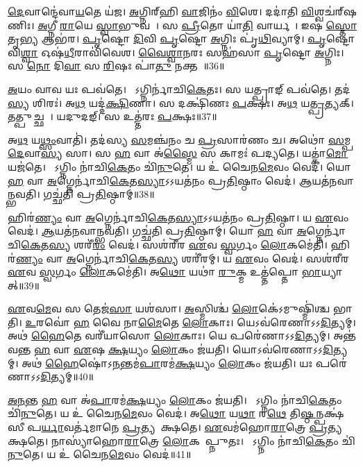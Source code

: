    \ul{𑌦𑍇}𑌵𑌾𑌨𑍍𑌦𑍇॑𑌵𑌾\ul{𑌯}𑌤𑍇 𑌯॑𑌜।
   \ul{𑌅}𑌗𑍍𑌨𑌿𑌰𑍍{‌}𑌹𑌿 \ul{𑌵𑌾}𑌜𑌿𑌨𑌂॑ \ul{𑌵𑌿}𑌶𑍇।
   𑌦𑌦𑌾॑𑌤𑌿 \ul{𑌵𑌿}𑌶𑍍𑌵𑌚॑𑌰𑍍{‌}𑌷𑌣𑌿𑌃।
   \ul{𑌅}𑌗𑍍𑌨𑍀 \ul{𑌰𑌾}𑌯𑍇 \ul{𑌸𑍍𑌵𑌾}𑌭𑍁𑌵𑌮𑍍᳚।
   𑌸 \ul{𑌪𑍍𑌰𑍀}𑌤𑍋 𑌯𑌾॑\ul{𑌤𑌿} 𑌵𑌾𑌰𑍍𑌯𑌮𑍍᳚।
   𑌇𑌷॑ \ul{𑌸𑍍𑌤𑍋}𑌤𑍃\ul{𑌭𑍍𑌯} 𑌆𑌭॑𑌰।
   \ul{𑌪𑍃}𑌷𑍍𑌟𑍋 \ul{𑌦𑌿}𑌵𑌿 \ul{𑌪𑍃}𑌷𑍍𑌟𑍋 \ul{𑌅}𑌗𑍍𑌨𑌿𑌃 𑌪𑍃॑\ul{𑌥𑌿}𑌵𑍍𑌯𑌾𑌮𑍍।
   \ul{𑌪𑍃}𑌷𑍍𑌟𑍋 𑌵𑌿\ul{𑌶𑍍𑌵𑌾} 𑌓𑌷॑\ul{𑌧𑍀}𑌰𑌾𑌵𑌿॑𑌵𑍇𑌶।
   \ul{𑌵𑍈}\ul{𑌶𑍍𑌵𑌾}\ul{𑌨}𑌰𑌃 𑌸𑌹॑𑌸𑌾 \ul{𑌪𑍃}𑌷𑍍𑌟𑍋 \ul{𑌅}𑌗𑍍𑌨𑌿𑌃।
   𑌸 \ul{𑌨𑍋} 𑌦𑌿\ul{𑌵𑌾} 𑌸 \ul{𑌰𑌿}𑌷𑌃 𑌪𑌾॑\ul{𑌤𑍁} 𑌨𑌕𑍍𑌤𑌮𑍍᳚॥36॥
\anuvakamend
  
   \ul{𑌅}𑌯𑌂 𑌵𑌾𑌵 𑌯𑌃 𑌪𑌵॑𑌤𑍇।
   𑌸𑍋᳚𑌽𑌗𑍍𑌨𑌿𑌰𑍍𑌨𑌾॑𑌚𑌿\ul{𑌕𑍇}𑌤𑌃।
   𑌸 𑌯𑌤𑍍𑌪𑍍𑌰𑌾𑌙𑍍 𑌪𑌵॑𑌤𑍇।
   𑌤𑌦॑\ul{𑌸𑍍𑌯} 𑌶𑌿𑌰𑌃॑।
   𑌅\ul{𑌥} 𑌯𑌦𑍍𑌦॑\ul{𑌕𑍍𑌷𑌿}𑌣𑌾।
   𑌸 𑌦𑌕𑍍𑌷𑌿॑𑌣𑌃 \ul{𑌪}𑌕𑍍𑌷𑌃।
   𑌅\ul{𑌥} 𑌯\ul{𑌤𑍍𑌪𑍍𑌰}𑌤𑍍𑌯𑌕𑍍।
   𑌤𑌤𑍍𑌪𑍁𑌚𑍍𑌛𑌮𑍍᳚।
   𑌯𑌦𑍁𑌦𑌙𑍍{‌}\sG{}।
   𑌸 𑌉𑌤𑍍𑌤॑𑌰𑌃 \ul{𑌪}𑌕𑍍𑌷𑌃॥37॥

   𑌅\ul{𑌥} 𑌯\ul{𑌥𑍍𑌸𑌂}𑌵𑌾𑌤𑌿॑।
   𑌤𑌦॑𑌸𑍍𑌯 \ul{𑌸}𑌮𑌞𑍍𑌚॑𑌨𑌂 𑌚 \ul{𑌪𑍍𑌰}𑌸𑌾𑌰॑𑌣𑌂 𑌚।
   𑌅𑌥𑍋॑ \ul{𑌸}𑌮𑍍𑌪\ul{𑌦𑍇}𑌵𑌾\ul{𑌸𑍍𑌯} 𑌸𑌾।
   𑌸 \ul{𑌹} 𑌵𑌾 𑌅॑\ul{𑌸𑍍𑌮𑍈} 𑌸 𑌕𑌾𑌮𑌃॑ 𑌪𑌦𑍍𑌯𑌤𑍇।
   𑌯𑌤𑍍𑌕𑌾॑\ul{𑌮𑍋} 𑌯𑌜॑𑌤𑍇।
   𑌯𑍋᳚𑌽𑌗𑍍𑌨𑌿𑌂 𑌨𑌾॑𑌚𑌿\ul{𑌕𑍇}𑌤𑌂 𑌚𑌿॑\ul{𑌨𑍁}𑌤𑍇।
   𑌯 𑌉॑ 𑌚𑍈𑌨\ul{𑌮𑍇}𑌵𑌂 𑌵𑍇𑌦॑।
   𑌯𑍋 \ul{𑌹} 𑌵𑌾 \ul{𑌅}𑌗𑍍𑌨𑍇𑌰𑍍𑌨𑌾॑𑌚𑌿\ul{𑌕𑍇}𑌤\ul{𑌸𑍍𑌯𑌾}𑌽𑌽𑌯𑌤॑𑌨𑌂 𑌪𑍍𑌰\ul{𑌤𑌿}𑌷𑍍𑌠𑌾𑌂 𑌵𑍇𑌦॑।
   \ul{𑌆}𑌯𑌤॑𑌨𑌵𑌾𑌨𑍍𑌭𑌵𑌤𑌿।
   𑌗𑌚𑍍𑌛॑𑌤𑌿 𑌪𑍍𑌰\ul{𑌤𑌿}𑌷𑍍𑌠𑌾𑌮𑍍॥38॥

   𑌹𑌿𑌰॑\ul{𑌣𑍍𑌯𑌂} 𑌵𑌾 \ul{𑌅}𑌗𑍍𑌨𑍇𑌰𑍍𑌨𑌾॑𑌚𑌿\ul{𑌕𑍇}𑌤\ul{𑌸𑍍𑌯𑌾}𑌽𑌽𑌯𑌤॑𑌨𑌂 𑌪𑍍𑌰\ul{𑌤𑌿}𑌷𑍍𑌠𑌾।
   𑌯 \ul{𑌏}𑌵𑌂 𑌵𑍇𑌦॑।
   \ul{𑌆}𑌯𑌤॑𑌨𑌵𑌾𑌨𑍍𑌭𑌵𑌤𑌿।
   𑌗𑌚𑍍𑌛॑𑌤𑌿 𑌪𑍍𑌰\ul{𑌤𑌿}𑌷𑍍𑌠𑌾𑌮𑍍।
   𑌯𑍋 \ul{𑌹} 𑌵𑌾 \ul{𑌅}𑌗𑍍𑌨𑍇𑌰𑍍𑌨𑌾॑𑌚𑌿\ul{𑌕𑍇}𑌤\ul{𑌸𑍍𑌯} 𑌶𑌰𑍀॑\ul{𑌰𑌂} 𑌵𑍇𑌦॑।
   𑌸𑌶॑𑌰𑍀𑌰 \ul{𑌏}𑌵 \ul{𑌸𑍍𑌵}𑌰𑍍𑌗𑌂 \ul{𑌲𑍋}𑌕𑌮𑍇॑𑌤𑌿।
   𑌹𑌿𑌰॑\ul{𑌣𑍍𑌯𑌂} 𑌵𑌾 \ul{𑌅}𑌗𑍍𑌨𑍇𑌰𑍍𑌨𑌾॑𑌚𑌿\ul{𑌕𑍇}𑌤\ul{𑌸𑍍𑌯} 𑌶𑌰𑍀॑𑌰𑌮𑍍।
   𑌯 \ul{𑌏}𑌵𑌂 𑌵𑍇𑌦॑।
   𑌸𑌶॑𑌰𑍀𑌰 \ul{𑌏}𑌵 \ul{𑌸𑍍𑌵}𑌰𑍍𑌗𑌂 \ul{𑌲𑍋}𑌕𑌮𑍇॑𑌤𑌿।
   𑌅\ul{𑌥𑍋} 𑌯𑌥𑌾॑ \ul{𑌰𑍁}𑌕𑍍𑌮 𑌉𑌤𑍍𑌤॑𑌪𑍍𑌤𑍋 \ul{𑌭𑌾}𑌯𑍍𑌯𑌾𑌤𑍍॥39॥

   \ul{𑌏}𑌵\ul{𑌮𑍇}𑌵 𑌸 𑌤𑍇𑌜॑\ul{𑌸𑌾} 𑌯𑌶॑𑌸𑌾।
   \ul{𑌅}𑌸𑍍𑌮𑌿𑌶𑍍𑌚॑ \ul{𑌲𑍋}𑌕𑍇॑𑌽𑌮𑍁𑌷𑍍𑌮𑌿॑𑌶𑍍𑌚 𑌭𑌾𑌤𑌿।
   \ul{𑌉}𑌰𑌵𑍋॑ \ul{𑌹} 𑌵𑍈 𑌨𑌾\ul{𑌮𑍈}𑌤𑍇 \ul{𑌲𑍋}𑌕𑌾𑌃।
   𑌯𑍇𑌽𑌵॑𑌰𑍇𑌣𑌾𑌽𑌽\ul{𑌦𑌿}𑌤𑍍𑌯𑌮𑍍।
   𑌅𑌥॑ \ul{𑌹𑍈}𑌤𑍇 𑌵𑌰𑍀॑𑌯𑌾𑌸𑍋 \ul{𑌲𑍋}𑌕𑌾𑌃।
   𑌯𑍇 𑌪𑌰𑍇॑𑌣𑌾𑌽𑌽\ul{𑌦𑌿}𑌤𑍍𑌯𑌮𑍍।
   𑌅𑌨𑍍𑌤॑𑌵𑌨𑍍𑌤 \ul{𑌹} 𑌵𑌾 \ul{𑌏}𑌷 \ul{𑌕𑍍𑌷}𑌯𑍍𑌯𑌂 \ul{𑌲𑍋}𑌕𑌂 𑌜॑𑌯𑌤𑌿।
   𑌯𑍋𑌽𑌵॑𑌰𑍇𑌣𑌾𑌽𑌽\ul{𑌦𑌿}𑌤𑍍𑌯𑌮𑍍।
   𑌅𑌥॑ \ul{𑌹𑍈}𑌷𑍋॑𑌽\ul{𑌨}𑌨𑍍𑌤𑌮॑\ul{𑌪𑌾}𑌰𑌮॑\ul{𑌕𑍍𑌷}𑌯𑍍𑌯𑌂 \ul{𑌲𑍋}𑌕𑌂 𑌜॑𑌯𑌤𑌿।
   𑌯𑌃 𑌪𑌰𑍇॑𑌣𑌾𑌽𑌽\ul{𑌦𑌿}𑌤𑍍𑌯𑌮𑍍॥40॥
   
   \ul{𑌅}\ul{𑌨}𑌨𑍍𑌤 \ul{𑌹} 𑌵𑌾 𑌅॑\ul{𑌪𑌾}𑌰𑌮॑\ul{𑌕𑍍𑌷}𑌯𑍍𑌯𑌂 \ul{𑌲𑍋}𑌕𑌂 𑌜॑𑌯𑌤𑌿।
   𑌯𑍋᳚𑌽𑌗𑍍𑌨𑌿𑌂 𑌨𑌾॑𑌚𑌿\ul{𑌕𑍇}𑌤𑌂 𑌚𑌿॑\ul{𑌨𑍁}𑌤𑍇।
   𑌯 𑌉॑ 𑌚𑍈𑌨\ul{𑌮𑍇}𑌵𑌂 𑌵𑍇𑌦॑।
   𑌅\ul{𑌥𑍋} 𑌯\ul{𑌥𑌾} 𑌰\ul{𑌥𑍇} 𑌤𑌿\ul{𑌷𑍍𑌠}𑌨𑍍𑌪𑌕𑍍𑌷॑𑌸𑍀 𑌪\ul{𑌰𑍍𑌯𑌾}𑌵𑌰𑍍𑌤॑𑌮𑌾𑌨𑍇 \ul{𑌪𑍍𑌰}𑌤𑍍𑌯𑌪𑍇᳚𑌕𑍍𑌷𑌤𑍇।
   \ul{𑌏}𑌵𑌮॑𑌹𑍋\ul{𑌰𑌾}𑌤𑍍𑌰𑍇 \ul{𑌪𑍍𑌰}𑌤𑍍𑌯𑌪𑍇᳚𑌕𑍍𑌷𑌤𑍇।
   𑌨𑌾𑌸𑍍𑌯𑌾॑𑌹𑍋\ul{𑌰𑌾}𑌤𑍍𑌰𑍇 \ul{𑌲𑍋}𑌕𑌮𑌾᳚𑌪𑍍𑌨𑍁𑌤𑌃।
   𑌯𑍋᳚𑌽𑌗𑍍𑌨𑌿𑌂 𑌨𑌾॑𑌚𑌿\ul{𑌕𑍇}𑌤𑌂 𑌚𑌿॑\ul{𑌨𑍁}𑌤𑍇।
   𑌯 𑌉॑ 𑌚𑍈𑌨\ul{𑌮𑍇}𑌵𑌂 𑌵𑍇𑌦॑॥41॥
\anuvakamend
  
